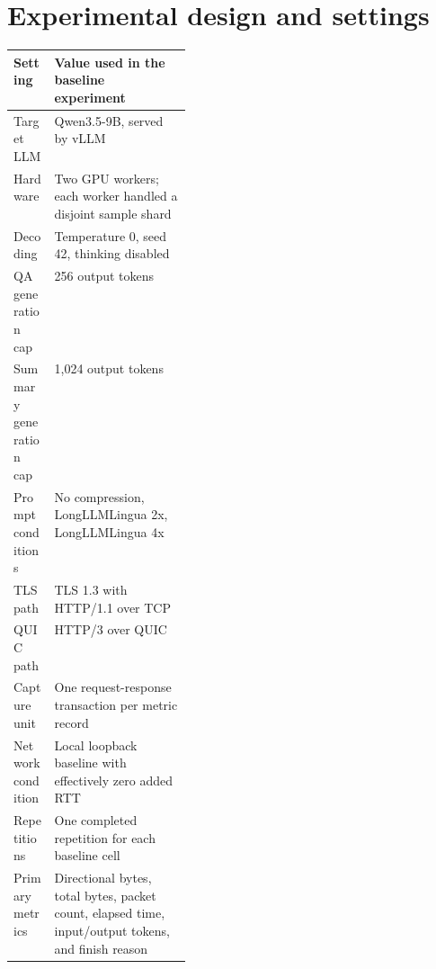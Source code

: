 \documentclass[10pt]{article}
\begin{document}
\section{Experimental design and settings}

\begin{center}
\end{center}

\begin{center}
\small
\renewcommand{\arraystretch}{1.22}
\begin{tabularx}{\linewidth}{@{}p{0.23\linewidth}Y@{}}
\toprule
\textbf{Setting} & \textbf{Value used in the baseline experiment} \\
\midrule
Target LLM & Qwen3.5-9B, served by vLLM \\
Hardware & Two GPU workers; each worker handled a disjoint sample shard \\
Decoding & Temperature 0, seed 42, thinking disabled \\
QA generation cap & 256 output tokens \\
Summary generation cap & 1,024 output tokens \\
Prompt conditions & No compression, LongLLMLingua 2x, LongLLMLingua 4x \\
TLS path & TLS 1.3 with HTTP/1.1 over TCP \\
QUIC path & HTTP/3 over QUIC \\
Capture unit & One request-response transaction per metric record \\
Network condition & Local loopback baseline with effectively zero added RTT \\
Repetitions & One completed repetition for each baseline cell \\
Primary metrics & Directional bytes, total bytes, packet count, elapsed time,
input/output tokens, and finish reason \\
\bottomrule
\end{tabularx}
\end{center}
\end{document}
